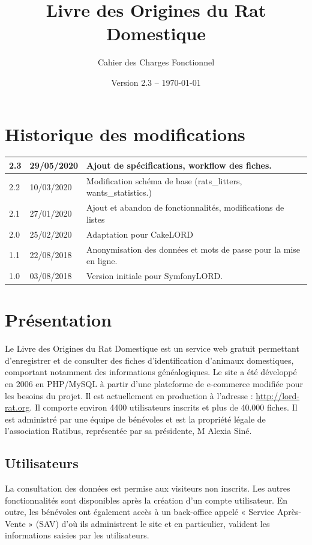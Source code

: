 \documentclass[a4paper,10pt]{article}
\title{Livre des Origines du Rat Domestique}
\author{Cahier des Charges Fonctionnel}
\date{Version 2.3 -- \today}
\begin{document}
\maketitle

\section*{Historique des modifications}

\large
\noindent\begin{tabularx}{\textwidth}{|l|l|X|}\hline
\textbf{2.3} & \textbf{29/05/2020} & Ajout de spécifications, workflow des fiches.\\\hline
2.2 & 10/03/2020 & Modification schéma de base (rats\_litters, wants\_statistics.)\\\hline
2.1 & 27/01/2020 & Ajout et abandon de fonctionnalités, modifications de listes\\\hline
2.0 & 25/02/2020 & Adaptation pour CakeLORD\\\hline
1.1 & 22/08/2018 & Anonymisation des données et mots de passe pour la mise en ligne.\\\hline
1.0 & 03/08/2018 & Version initiale pour SymfonyLORD.\\\hline
\end{tabularx}
\normalsize

\vfill

\tableofcontents

\section{Présentation}
Le Livre des Origines du Rat Domestique est un service web gratuit permettant d'enregistrer et de consulter des fiches d'identification d'animaux domestiques, comportant notamment des informations généalogiques. Le site a été développé en 2006 en PHP/MySQL à partir d'une plateforme de e-commerce modifiée pour les besoins du projet. Il est actuellement en production à l'adresse : \url{http://lord-rat.org}. Il comporte environ 4400 utilisateurs inscrits et plus de 40.000 fiches. Il est administré par une équipe de bénévoles et est la propriété légale de l'association Ratibus, représentée par sa présidente, M Alexia Siné.

\subsection{Utilisateurs}
La consultation des données est permise aux visiteurs non inscrits. Les autres fonctionnalités sont disponibles après la création d'un compte utilisateur. En outre, les bénévoles ont également accès à un back-office appelé « Service Après-Vente » (SAV) d'où ils administrent le site et en particulier, valident les informations saisies par les utilisateurs.
\end{document}

